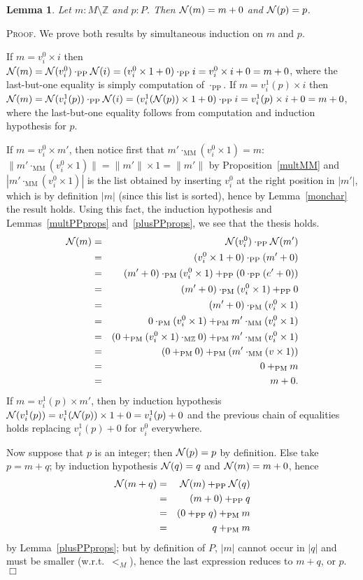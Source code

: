\documentclass{article}
\newtheorem{lemma}[definition]{Lemma}
\newenvironment{proof}{\smallskip\textsc{Proof.}}{\hspace*{\fill}$\Box$}
\newcommand{\N}{{\cal N}}
\newcommand{\Z}{{\mathbb Z}}
\newcommand{\multMZ}{\ensuremath{\cdot_{\mathrm M\Z}}}
\newcommand{\multMM}{\ensuremath{\cdot_{\mathrm{MM}}}}
\newcommand{\plusPM}{\ensuremath{+_{\mathrm{PM}}}}
\newcommand{\plusPP}{\ensuremath{+_{\mathrm{PP}}}}
\newcommand{\multPM}{\ensuremath{\cdot_{\mathrm{PM}}}}
\newcommand{\multPP}{\ensuremath{\cdot_{\mathrm{PP}}}}
\begin{document}
\begin{lemma}\label{NormRmon} Let $m:M\setminus\Z$ and $p:P$.
Then $\N(m)=m+0$ and $\N(p)=p$.
\end{lemma}
\begin{proof}
We prove both results by simultaneous induction on $m$ and $p$.

If $m=v^0_i\times i$ then
$\N(m)%
=\N(v^0_i)\multPP\N(i)%
=(v^0_i\times1+0)\multPP i%
=v^0_i\times i+0%
=m+0$,
where the last-but-one equality is simply computation of {\multPP}.
If $m=v^1_i(p)\times i$ then
$\N(m)%
=\N(v^1_i(p))\multPP\N(i)%
=(v^1_i(\N(p))\times1+0)\multPP i%
=v^1_i(p)\times i+0%
=m+0$,
where the last-but-one equality follows from computation and induction
hypothesis for $p$.

If $m=v^0_i\times m'$, then notice first that $m'\multMM(v^0_i\times 1)=m$:
$\|m'\multMM(v^0_i\times1)\|=\|m'\|\times1=\|m'\|$ by Proposition~\ref{multMM}
and $|m'\multMM(v^0_i\times 1)|$ is the list obtained by inserting $v^0_i$ at
the right position in $|m'|$, which is by definition $|m|$ (since this list is
sorted), hence by Lemma~\ref{monchar} the result holds.
Using this fact, the induction hypothesis and Lemmas~\ref{multPPprops}
and~\ref{plusPPprops}, we see that the thesis holds.
\begin{eqnarray*}
\N(m) & = & \N(v^0_i)\multPP\N(m') \\
 & = & (v^0_i\times1+0)\multPP(m'+0) \\
 & = & (m'+0)\multPM(v^0_i\times1)\plusPP(0\multPP(e'+0))\\
 & = & (m'+0)\multPM(v^0_i\times1)\plusPP0\\
 & = & (m'+0)\multPM(v^0_i\times1)\\
 & = & 0\multPM(v^0_i\times 1)\plusPM m'\multMM(v^0_i\times1)\\
 & = & (0\plusPM(v^0_i\times1)\multMZ0)\plusPM m'\multMM(v^0_i\times1)\\
 & = & (0\plusPM0)\plusPM(m'\multMM(v\times 1))\\
 & = & 0\plusPM m\\
 & = & m+0.
\end{eqnarray*}
If $m=v^1_i(p)\times m'$, then by induction hypothesis
$\N(v^1_i(p))%
=v^1_i(\N(p))\times1+0%
=v^1_i(p)+0$
and the previous chain of equalities holds replacing $v^1_i(p)+0$ for
$v^0_i$ everywhere.

Now suppose that $p$ is an integer; then $\N(p)=p$ by definition.
Else take $p=m+q$; by induction hypothesis $\N(q)=q$ and $\N(m)=m+0$, hence
\begin{eqnarray*}
\N(m+q) & = & \N(m)\plusPP\N(q) \\
 & = & (m+0)\plusPP q\\
 & = & (0\plusPP q)\plusPM m\\
 & = & q\plusPM m
\end{eqnarray*}
by Lemma~\ref{plusPPprops}; but by definition of $P$, $|m|$ cannot occur
in $|q|$ and must be smaller (w.r.t.\ $<_M$), hence the last expression
reduces to $m+q$, or $p$.
\end{proof}
\end{document}
